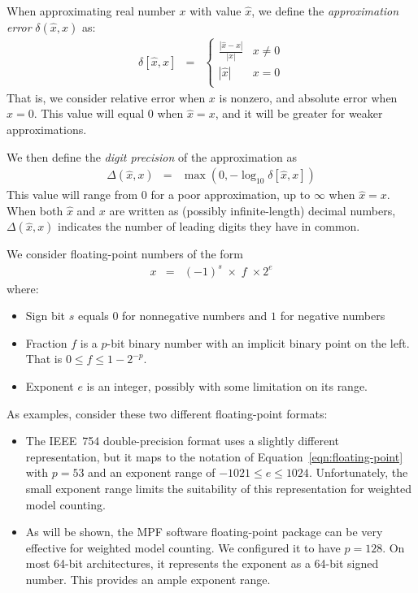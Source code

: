 \documentclass[letterpaper,USenglish,cleveref, autoref, thm-restate]{lipics-v2021}
\newcommand{\approximate}[1]{\hat{#1}}
\newcommand{\approxx}{\approximate{x}}
\newcommand{\aerror}{\delta}
\newcommand{\digitprecision}{\Delta}
\begin{document}
When approximating real number $x$ with value $\approximate{x}$, we
define the \emph{approximation error} $\aerror(\approxx, x)$ as:
\begin{eqnarray}
\aerror[\approxx, x] & = & \left\{ \begin{array}{ll}
  \frac{|\approxx - x|}{|x|} \label{eqn:approx:error} & x \not = 0\\[0.8em]
  |\approxx| & x = 0\\
  \end{array} \right.
\end{eqnarray}
That is, we consider relative error when $x$ is nonzero, and absolute error when $x=0$.  This value will equal 0 when $\approxx=x$, and it will be greater for weaker approximations.

We then define the \emph{digit precision} of the approximation as
\begin{eqnarray}
\digitprecision(\approxx, x) & = & \max(0, -\log_{10} \aerror[\approxx, x]) \label{eqn:digitprecision} 
\end{eqnarray}
This value will range from $0$ for a poor approximation, up to $\infty$ when $\approxx=x$.
When both $\approxx$ and $x$ are written as (possibly infinite-length)
decimal numbers, $\digitprecision(\approxx,x)$ indicates the number of
leading digits they have in common.  

We consider floating-point numbers of the form
\begin{eqnarray}
x & = & (-1)^s \; \times \; f \; \times 2^{e} \label{eqn:floating-point}
\end{eqnarray}
where:
\begin{itemize}
\item Sign bit $s$ equals $0$ for nonnegative numbers and $1$ for negative numbers
\item Fraction $f$ is a $p$-bit binary number with an implicit binary point on the left.  That is $0 \leq f \leq 1-2^{-p}$.
\item Exponent $e$ is an integer, possibly with some limitation on its range.
\end{itemize}
As examples, consider these two different floating-point formats:
\begin{itemize}
\item The IEEE~754 double-precision format uses a slightly different representation, but it maps to the notation of Equation~\ref{eqn:floating-point} with $p=53$ and an exponent range of
  $-1021 \leq e \leq 1024$.  Unfortunately, the small exponent range limits the suitability of
  this representation for weighted model counting.
\item As will be shown, the MPF software floating-point package can be very effective for weighted model counting.
We configured it to have $p=128$. On most 64-bit architectures, it represents
  the exponent as a 64-bit signed number.  This provides an ample exponent range.
\end{itemize}
\end{document}
